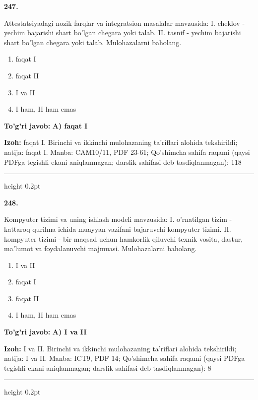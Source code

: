 \documentclass[10pt,a4paper]{article}
\begin{document}
{\bfseries\sffamily\color{ink} 247.}
\par
Attestatsiyadagi nozik farqlar va integratsion masalalar mavzusida: I. cheklov - yechim bajarishi shart bo'lgan chegara yoki talab. II. tasnif - yechim bajarishi shart bo'lgan chegara yoki talab. Mulohazalarni baholang.
\begin{enumerate}[label=\Alph*),leftmargin=9mm]
\item faqat I
\item faqat II
\item I va II
\item I ham, II ham emas
\end{enumerate}
\begin{tcolorbox}[enhanced,breakable,colback=teal!4,colframe=teal!60!black,boxrule=0.45pt,arc=1.2mm,left=2.7mm,right=2.7mm,top=1.8mm,bottom=1.8mm,before skip=2mm,after skip=2mm]
{\bfseries\sffamily\color{teal}To'g'ri javob:} \textbf{A) faqat I}
\par\smallskip
{\bfseries Izoh:} faqat I. Birinchi va ikkinchi mulohazaning ta'riflari alohida tekshirildi; natija: faqat I. Manba: CAM10/11, PDF 23-61; Qo'shimcha sahifa raqami (qaysi PDFga tegishli ekani aniqlanmagan; darslik sahifasi deb tasdiqlanmagan): 118
\end{tcolorbox}
\vspace{2mm}\hrule height 0.2pt\vspace{3mm}

{\bfseries\sffamily\color{ink} 248.}
\par
Kompyuter tizimi va uning ishlash modeli mavzusida: I. o'rnatilgan tizim - kattaroq qurilma ichida muayyan vazifani bajaruvchi kompyuter tizimi. II. kompyuter tizimi - bir maqsad uchun hamkorlik qiluvchi texnik vosita, dastur, ma'lumot va foydalanuvchi majmuasi. Mulohazalarni baholang.
\begin{enumerate}[label=\Alph*),leftmargin=9mm]
\item I va II
\item faqat I
\item faqat II
\item I ham, II ham emas
\end{enumerate}
\begin{tcolorbox}[enhanced,breakable,colback=teal!4,colframe=teal!60!black,boxrule=0.45pt,arc=1.2mm,left=2.7mm,right=2.7mm,top=1.8mm,bottom=1.8mm,before skip=2mm,after skip=2mm]
{\bfseries\sffamily\color{teal}To'g'ri javob:} \textbf{A) I va II}
\par\smallskip
{\bfseries Izoh:} I va II. Birinchi va ikkinchi mulohazaning ta'riflari alohida tekshirildi; natija: I va II. Manba: ICT9, PDF 14; Qo'shimcha sahifa raqami (qaysi PDFga tegishli ekani aniqlanmagan; darslik sahifasi deb tasdiqlanmagan): 8
\end{tcolorbox}
\vspace{2mm}\hrule height 0.2pt\vspace{3mm}
\end{document}
